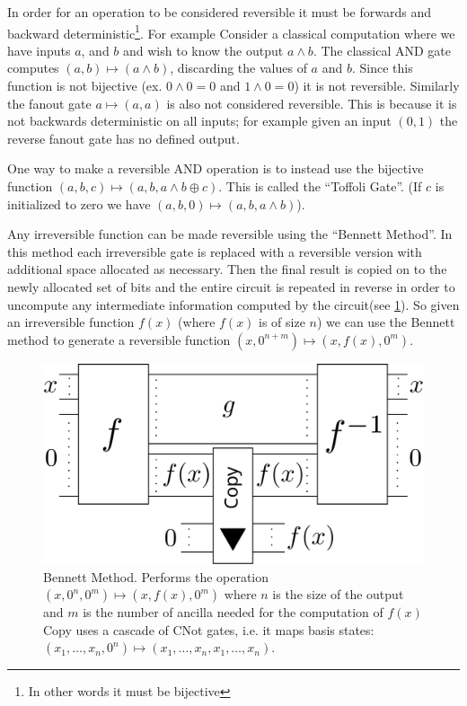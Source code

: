 In order for an operation to be considered reversible it must be forwards and
backward deterministic\footnote{In other words it must be bijective}. For example
Consider a classical computation where we have inputs $a$, and $b$ and wish to
know the output $a\land b$. The classical AND gate computes $(a,b)\mapsto
(a\land b)$, discarding the values of $a$ and $b$. Since this function is not
bijective (ex. $0\land 0 = 0$ and $1 \land 0 = 0$) it is not reversible.
Similarly the fanout gate $a\mapsto (a,a)$ is also not considered reversible.
This is because it is not backwards deterministic on all inputs; for example
given an input $(0,1)$ the reverse fanout gate has no defined output.

One way to make a reversible AND operation
is to instead use the bijective function $(a,b,c) \mapsto (a,b,a\land b \oplus
c)$. This is called the ``Toffoli Gate''.  (If $c$ is initialized to zero we
have $(a,b,0) \mapsto (a,b,a\land b)$).

Any irreversible function can be made reversible using the ``Bennett
Method''\cite{Bennett:73}. In this method each irreversible gate is replaced
with a reversible version with additional space allocated as necessary. Then
the final result is copied on to the newly allocated set of bits and the entire
circuit is repeated in reverse in order to uncompute any intermediate
information computed by the circuit(see \cref{fig:bennett}). So given an irreversible
function $f(x)$ (where $f(x)$ is of size $n$) we can use the Bennett method to
generate a reversible function $(x,0^{n+m}) \mapsto (x,f(x),0^m)$.

\begin{figure}
      \capstart
      \centering
      \includegraphics[width=0.8\hsize]{images/bennett}

      \caption{Bennett Method. Performs the operation
         $(x,0^n,0^m)\mapsto(x,f(x),0^m)$ where $n$ is the size of the output and $m$ is
         the number of ancilla needed for the computation of $f(x)$ Copy uses a cascade
         of CNot gates, i.e. it maps basis states:
         $(x_1,\dotsc,x_n,0^n)\mapsto(x_1,\dotsc,x_n,x_1,\dotsc,x_n)$. }

      \label{fig:bennett}
\end{figure}

